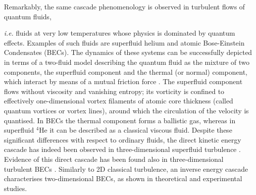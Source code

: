 \documentclass[%
 reprint,
 amsmath,amssymb,
 aps,
 prl,
]{revtex4-2}
\begin{document}
Remarkably, the same cascade phenomenology is observed in turbulent flows 
of quantum fluids, {\textit{i.e.} fluids at very low temperatures whose physics is
dominated by quantum effects.
Examples of such fluids are superfluid helium 
and atomic Bose-Einstein Condensates (BECs). 
The dynamics of these systems can be successfully depicted in terms of 
a two-fluid model \cite{tisza-1938,landau-1949,skrbek-sreenivasan-2012} 
describing the quantum fluid as the mixture of two components, 
the superfluid component and the thermal (or normal) component, which 
interact by means of a mutual friction force 
\cite{jackson-etal-2009,hall-vinen-1956a,hall-vinen-1956b}. 
The superfluid component flows without viscosity and
vanishing entropy; its vorticity is
confined to effectively one-dimensional vortex filaments
of atomic core thickness (called quantum vortices or vortex lines), 
around which the circulation of the velocity is quantised.
In BECs the thermal component forms a ballistic gas,
whereas in superfluid $^4$He it can be described as
a classical viscous fluid.
Despite these significant differences with respect to ordinary fluids, 
the direct
kinetic energy cascade has
indeed been observed in three-dimensional superfluid
turbulence 
\cite{maurer1998,salort2010turbulent,baggaley2012,sherwin-robson2015,Muller_KolmogorovKelvinWave_2020,Muller_IntermittencyVelocityCirculation_2021}.
Evidence of this 
direct
cascade has been found also in
three-dimensional turbulent BECs \cite{middleton-spencer2022}. Similarly to 2D classical turbulence, 
an inverse energy cascade characterises two-dimensional BECs, 
as shown in theoretical \cite{bradley2012energy,reeves2013,simula2014emergence,Muller_ExploringEquivalenceTwoDimensional_2024} and experimental \cite{johnstone2019evolution,gauthier2019giant} studies.

}
\end{document}

